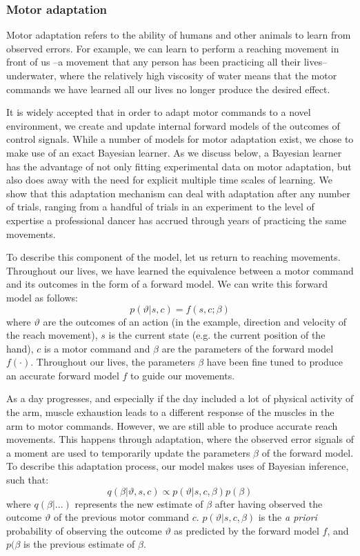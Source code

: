 \documentclass[a4paper,doc,floatsintext,natbib]{apa6}
\begin{document}
\subsubsection{Motor adaptation}
Motor adaptation refers to the ability of humans and other animals to learn from observed errors. For example, we can learn to perform a reaching movement in front of us --a movement that any person has been practicing all their lives-- underwater, where the relatively high viscosity of water means that the motor commands we have learned all our lives no longer produce the desired effect.

It is widely accepted that in order to adapt motor commands to a novel environment, we create and update internal forward models of the outcomes of control signals. While a number of models for motor adaptation exist, we chose to make use of an exact Bayesian learner. As we discuss below, a Bayesian learner has the advantage of not only fitting experimental data on motor adaptation, but also does away with the need for explicit multiple time scales of learning. We show that this adaptation mechanism can deal with adaptation after any number of trials, ranging from a handful of trials in an experiment to the level of expertise a professional dancer has accrued through years of practicing the same movements.

To describe this component of the model, let us return to reaching movements. Throughout our lives, we have learned the equivalence between a motor command and its outcomes in the form of a forward model. We can write this forward model as follows:
\begin{equation}
p(\vartheta | s, c) = f(s, c; \beta)
\end{equation}
where $\vartheta$ are the outcomes of an action (in the example, direction and velocity of the reach movement), $s$ is the current state (e.g. the current position of the hand), $c$ is a motor command and $\beta$ are the parameters of the forward model $f(\cdot)$. Throughout our lives, the parameters $\beta$ have been fine tuned to produce an accurate forward model $f$ to guide our movements.

As a day progresses, and especially if the day included a lot of physical activity of the arm, muscle exhaustion leads to a different response of the muscles in the arm to motor commands. However, we are still able to produce accurate reach movements. This happens through adaptation, where the observed error signals of a moment are used to temporarily update the parameters $\beta$ of the forward model. To describe this adaptation process, our model makes uses of Bayesian inference, such that:
\begin{equation}
q(\beta | \vartheta, s, c) \propto p(\vartheta | s, c, \beta)p(\beta)
\end{equation}
where $q(\beta | ...)$ represents the new estimate of $\beta$ after having observed the outcome $\vartheta$ of the previous motor command $c$. $p(\vartheta | s, c, \beta)$ is the \textit{a priori} probability of observing the outcome $\vartheta$ as predicted by the forward model $f$, and $p(\beta$ is the previous estimate of $\beta$.
\end{document}
